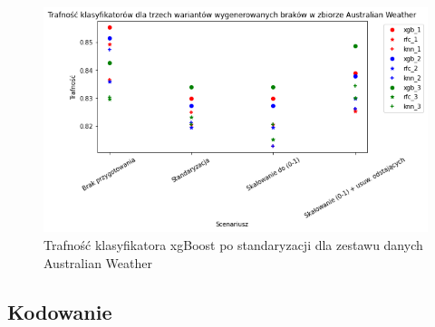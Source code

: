 \documentclass{book}
\begin{document}
    \begin{figure}[H]
    \centerline{\includegraphics[scale=0.8]{Aus_Weather_Standaryzacja}}
    \centering
    \caption{Trafność klasyfikatora xgBoost po standaryzacji dla zestawu danych Australian Weather}
    \end{figure}

\subsection{Kodowanie}
\end{document}
